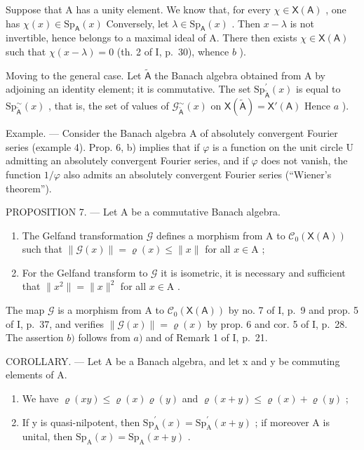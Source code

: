 Suppose that A has a unity element. We know that, for every \(\chi \in \mathsf{X}(\mathsf{A})\) , one has \(\chi(x) \in \mathrm{Sp}_{\mathsf{A}}(x)\) Conversely, let \(\lambda \in \mathrm{Sp}_{\mathsf{A}}(x)\) . Then \(x - \lambda\) is not invertible, hence belongs to a maximal ideal of A. There then exists \(\chi \in \mathsf{X}(\mathsf{A})\) such that \(\chi(x - \lambda) = 0\) (th. 2 of I, p.~30), whence \(b\) ).

Moving to the general case. Let \(\widetilde{\mathsf{A}}\) the Banach algebra obtained from A by adjoining an identity element; it is commutative. The set \(\mathrm{Sp}_{\widetilde{\mathsf{A}}}^{\prime}(x)\) is equal to \(\mathrm{Sp}_{\widetilde{\mathsf{A}}}^{\sim}(x)\) , that is, the set of values of \(\mathcal{G}_{\widetilde{\mathsf{A}}}^{\sim}(x)\) on \(\mathsf{X}(\widetilde{\mathsf{A}}) = \mathsf{X}'(\mathsf{A})\) Hence \(a\) ).

Example. --- Consider the Banach algebra A of absolutely convergent Fourier series (example 4). Prop. 6, b) implies that if \(\varphi\) is a function on the unit circle U admitting an absolutely convergent Fourier series, and if \(\varphi\) does not vanish, the function \(1/\varphi\) also admits an absolutely convergent Fourier series (“Wiener’s theorem”).

PROPOSITION 7. --- Let A be a commutative Banach algebra.

\begin{enumerate}
\def\labelenumi{\alph{enumi})}
\item
  The Gelfand transformation \(\mathcal{G}\) defines a morphism from A to \(\mathcal{C}_0(\mathsf{X}(\mathsf{A}))\) such that \(\| \mathcal{G}(x)\| = \varrho (x)\leqslant \| x\|\) for all \(x\in \mathrm{A}\) ;
\item
  For the Gelfand transform to \(\mathcal{G}\) it is isometric, it is necessary and sufficient that \(\|x^{2}\|=\|x\|^{2}\) for all \(x\in\mathrm{A}\) .
\end{enumerate}

The map \(\mathcal{G}\) is a morphism from A to \(\mathcal{C}_0(\mathsf{X}(\mathsf{A}))\) by no. 7 of I, p.~9 and prop. 5 of I, p.~37, and verifies \(\| \mathcal{G}(x)\| = \varrho (x)\) by prop. 6 and cor. 5 of I, p.~28. The assertion \(b)\) follows from \(a)\) and of Remark 1 of I, p.~21.

COROLLARY. --- Let A be a Banach algebra, and let x and y be commuting elements of A.

\begin{enumerate}
\def\labelenumi{\alph{enumi})}
\item
  We have \(\varrho(xy) \leqslant \varrho(x)\varrho(y)\) and \(\varrho(x + y) \leqslant \varrho(x) + \varrho(y)\) ;
\item
  If y is quasi-nilpotent, then \(\mathrm{Sp}_{\mathrm{A}}^{\prime}(x)=\mathrm{Sp}_{\mathrm{A}}^{\prime}(x+y)\) ; if moreover A is unital, then \(\mathrm{Sp}_{\mathrm{A}}(x)=\mathrm{Sp}_{\mathrm{A}}(x+y)\) .
\end{enumerate}

